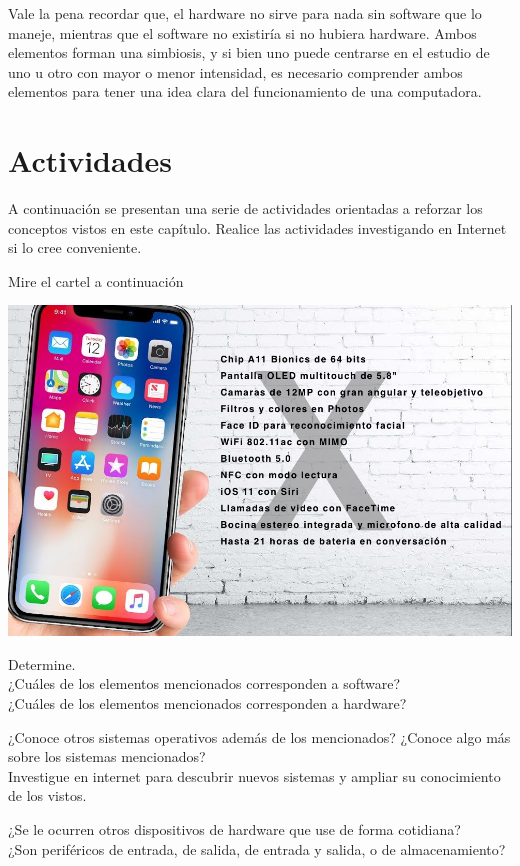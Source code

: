 Vale la pena recordar que, el hardware no sirve para nada sin software que lo
maneje, mientras que el software no existiría si no hubiera hardware. Ambos
elementos forman una simbiosis, y si bien uno puede centrarse en el estudio de
uno u otro con mayor o menor intensidad, es necesario comprender ambos elementos
para tener una idea clara del funcionamiento de una computadora.

\section{Actividades}
\label{chap:computadoras:sec:actividades}

A continuación se presentan una serie de actividades orientadas a reforzar los
conceptos vistos en este capítulo. Realice las actividades investigando en
Internet si lo cree conveniente.

\begin{exercise}
Mire el cartel a continuación\\
\centerline{\includegraphics[scale=0.28]{unidades/1_computadoras/1_computadoras/imagenes/iphone_x_specs.png}}

Determine.\\
¿Cuáles de los elementos mencionados corresponden a software?\\
¿Cuáles de los elementos mencionados corresponden a hardware?
\end{exercise}

\begin{exercise}
¿Conoce otros sistemas operativos además de los mencionados? ¿Conoce algo más
sobre los sistemas mencionados?\\
Investigue en internet para descubrir nuevos sistemas y ampliar su conocimiento
de los vistos.
\end{exercise}

\begin{exercise}
¿Se le ocurren otros dispositivos de hardware que use de forma cotidiana?\\
¿Son periféricos de entrada, de salida, de entrada y salida, o de
almacenamiento?
\end{exercise}
